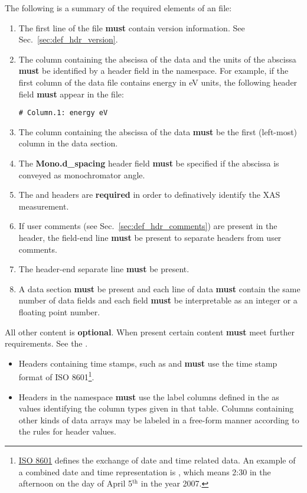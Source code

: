 \documentclass{article}
\begin{document}
The following is a summary of the required elements of an {\xdi} file:

\begin{enumerate}
\item The first line of the file \textbf{must} contain version
  information. See Sec.~\ref{sec:def_hdr_version}.
\item The column containing the abscissa of the data and the units of
  the abscissa \textbf{must} be identified by a header field in the
   namespace.  For example, if the first column of the
  data file contains energy in eV units, the following header field
  \textbf{must} appear in the file:
\begin{verbatim}
# Column.1: energy eV
\end{verbatim}
\item The column containing the abscissa of the data \textbf{must} be
  the first (left-most) column in the data section.
\item The \textbf{Mono.d\_spacing} header field \textbf{must} be
  specified if the abscissa is conveyed as monochromator angle.
\item The  and  headers
  are \textbf{required} in order to definatively identify the XAS
  measurement.
\item If user comments (see Sec.~\ref{sec:def_hdr_comments}) are
  present in the header, the field-end line \textbf{must} be
  present to separate headers from user comments.
\item The header-end separate line \textbf{must} be present.
\item A data section \textbf{must} be present and each line of data
  \textbf{must} contain the same number of data fields and each field
  \textbf{must} be interpretable as an integer or a floating point
  number.
\end{enumerate}

All other content is \textbf{optional}.  When present certain content
\textbf{must} meet further requirements.  See the {\DMD}.

\begin{itemize}
\item Headers containing time stamps, such as 
  and  \textbf{must} use the time stamp format
  of ISO
  8601\footnote{\href{http://en.wikipedia.org/wiki/ISO_8601}{ISO 8601}
    defines the exchange of date and time related data.  An example of
    a combined date and time representation is
    , which means 2:30 in the afternoon on the
    day of April 5${^\mathrm{th}}$ in the year 2007.}.
\item Headers in the  namespace \textbf{must} use the
  label columns defined in the {\DMD} as values identifying the column
  types given in that table.  Columns containing other kinds of data
  arrays may be labeled in a free-form manner according to the rules
  for header values.
\end{itemize}
\end{document}
